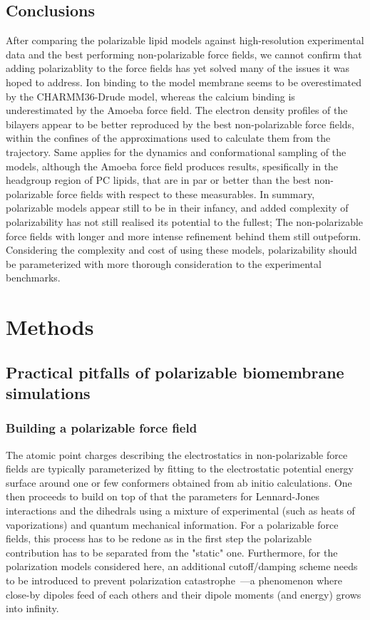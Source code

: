 \documentclass[journal=jacsat,manuscript=article,layout=singlecolumn]{achemso}
\begin{document}
\subsection{Conclusions}
After comparing the polarizable lipid models against high-resolution experimental data and the best performing non-polarizable force fields, we cannot confirm that adding polarizablity to the force fields has yet solved many of the issues it was hoped to address. Ion binding to the model membrane seems to be overestimated by the CHARMM36-Drude model, whereas the calcium binding is underestimated by the Amoeba force field. The electron density profiles of the bilayers appear to be better reproduced by the best non-polarizable force fields, within the confines of the approximations used to calculate them from the trajectory. Same applies for the dynamics and conformational sampling of the models, although the Amoeba force field produces results, spesifically in the headgroup region of PC lipids, that are in par or better than the best non-polarizable force fields with respect to these measurables. In summary, polarizable models appear still to be in their infancy, and added complexity of polarizability has not still realised its potential to the fullest; The non-polarizable force fields with longer and more intense refinement behind them still outpeform. Considering the complexity and cost of using these models, polarizability should be parameterized with more thorough consideration to the experimental benchmarks.

\section{Methods}
\subsection{Practical pitfalls of polarizable biomembrane simulations}


\subsubsection{Building a polarizable force field}

The atomic point charges describing the electrostatics in non-polarizable force fields are typically parameterized by fitting to the electrostatic potential energy surface around one or few conformers obtained from ab initio calculations. One then proceeds to build on top of that the parameters for Lennard-Jones interactions and the dihedrals using a mixture of experimental (such as heats of vaporizations) and quantum mechanical information. For a polarizable force fields, this process has to be redone as in the first step the polarizable contribution has to be separated from the "static" one. Furthermore, for the polarization models considered here, an additional cutoff/damping scheme needs to be introduced to prevent polarization catastrophe~\cite{Thole1981}---a phenomenon where close-by dipoles feed of each others and their dipole moments (and energy) grows into infinity.
\end{document}
